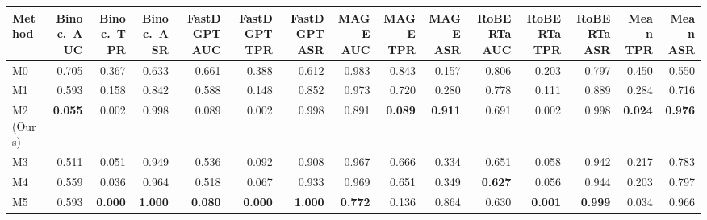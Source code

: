 \begin{tabular}{lrrrrrrrrrrrrrr}
\toprule
Method & Binoc.\ AUC & Binoc.\ TPR & Binoc.\ ASR & FastDGPT AUC & FastDGPT TPR & FastDGPT ASR & MAGE AUC & MAGE TPR & MAGE ASR & RoBERTa AUC & RoBERTa TPR & RoBERTa ASR & Mean TPR & Mean ASR \\
\midrule
M0 & 0.705 & 0.367 & 0.633 & 0.661 & 0.388 & 0.612 & 0.983 & 0.843 & 0.157 & 0.806 & 0.203 & 0.797 & 0.450 & 0.550 \\
M1 & 0.593 & 0.158 & 0.842 & 0.588 & 0.148 & 0.852 & 0.973 & 0.720 & 0.280 & 0.778 & 0.111 & 0.889 & 0.284 & 0.716 \\
M2 (Ours) & \textbf{0.055} & 0.002 & 0.998 & 0.089 & 0.002 & 0.998 & 0.891 & \textbf{0.089} & \textbf{0.911} & 0.691 & 0.002 & 0.998 & \textbf{0.024} & \textbf{0.976} \\
M3 & 0.511 & 0.051 & 0.949 & 0.536 & 0.092 & 0.908 & 0.967 & 0.666 & 0.334 & 0.651 & 0.058 & 0.942 & 0.217 & 0.783 \\
M4 & 0.559 & 0.036 & 0.964 & 0.518 & 0.067 & 0.933 & 0.969 & 0.651 & 0.349 & \textbf{0.627} & 0.056 & 0.944 & 0.203 & 0.797 \\
M5 & 0.593 & \textbf{0.000} & \textbf{1.000} & \textbf{0.080} & \textbf{0.000} & \textbf{1.000} & \textbf{0.772} & 0.136 & 0.864 & 0.630 & \textbf{0.001} & \textbf{0.999} & 0.034 & 0.966 \\
\bottomrule
\end{tabular}
